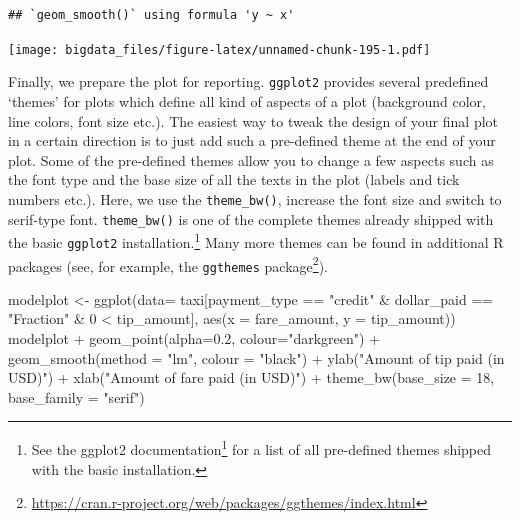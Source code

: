 \documentclass[
  12pt,
]{style/krantz}
\newenvironment{Shaded}{\begin{snugshade}}{\end{snugshade}}
\newcommand{\AttributeTok}[1]{\textcolor[rgb]{0.77,0.63,0.00}{#1}}
\newcommand{\DecValTok}[1]{\textcolor[rgb]{0.00,0.00,0.81}{#1}}
\newcommand{\FloatTok}[1]{\textcolor[rgb]{0.00,0.00,0.81}{#1}}
\newcommand{\FunctionTok}[1]{\textcolor[rgb]{0.00,0.00,0.00}{#1}}
\newcommand{\NormalTok}[1]{#1}
\newcommand{\OtherTok}[1]{\textcolor[rgb]{0.56,0.35,0.01}{#1}}
\newcommand{\SpecialCharTok}[1]{\textcolor[rgb]{0.00,0.00,0.00}{#1}}
\newcommand{\StringTok}[1]{\textcolor[rgb]{0.31,0.60,0.02}{#1}}
\renewcommand{\href}[2]{#2\footnote{\url{#1}}}
\begin{document}
\begin{verbatim}
## `geom_smooth()` using formula 'y ~ x'
\end{verbatim}

\texttt{[image: bigdata\_files/figure-latex/unnamed-chunk-195-1.pdf]}

Finally, we prepare the plot for reporting. \texttt{ggplot2} provides several predefined `themes' for plots which define all kind of aspects of a plot (background color, line colors, font size etc.). The easiest way to tweak the design of your final plot in a certain direction is to just add such a pre-defined theme at the end of your plot. Some of the pre-defined themes allow you to change a few aspects such as the font type and the base size of all the texts in the plot (labels and tick numbers etc.). Here, we use the \texttt{theme\_bw()}, increase the font size and switch to serif-type font. \texttt{theme\_bw()} is one of the complete themes already shipped with the basic \texttt{ggplot2} installation.\footnote{See \href{https://ggplot2.tidyverse.org/reference/ggtheme.html}{the ggplot2 documentation} for a list of all pre-defined themes shipped with the basic installation.} Many more themes can be found in additional R packages (see, for example, the \href{https://cran.r-project.org/web/packages/ggthemes/index.html}{\texttt{ggthemes} package}).

\begin{Shaded}
\begin{Highlighting}[]
\NormalTok{modelplot }\OtherTok{\textless{}{-}} \FunctionTok{ggplot}\NormalTok{(}\AttributeTok{data=}\NormalTok{ taxi[payment\_type }\SpecialCharTok{==} \StringTok{"credit"} \SpecialCharTok{\&}\NormalTok{ dollar\_paid }\SpecialCharTok{==} \StringTok{"Fraction"} \SpecialCharTok{\&} \DecValTok{0} \SpecialCharTok{\textless{}}\NormalTok{ tip\_amount],}
                    \FunctionTok{aes}\NormalTok{(}\AttributeTok{x =}\NormalTok{ fare\_amount, }\AttributeTok{y =}\NormalTok{ tip\_amount))}
\NormalTok{modelplot }\SpecialCharTok{+}
     \FunctionTok{geom\_point}\NormalTok{(}\AttributeTok{alpha=}\FloatTok{0.2}\NormalTok{, }\AttributeTok{colour=}\StringTok{"darkgreen"}\NormalTok{) }\SpecialCharTok{+}
     \FunctionTok{geom\_smooth}\NormalTok{(}\AttributeTok{method =} \StringTok{"lm"}\NormalTok{, }\AttributeTok{colour =} \StringTok{"black"}\NormalTok{) }\SpecialCharTok{+}
     \FunctionTok{ylab}\NormalTok{(}\StringTok{"Amount of tip paid (in USD)"}\NormalTok{) }\SpecialCharTok{+}
     \FunctionTok{xlab}\NormalTok{(}\StringTok{"Amount of fare paid (in USD)"}\NormalTok{) }\SpecialCharTok{+}
     \FunctionTok{theme\_bw}\NormalTok{(}\AttributeTok{base\_size =} \DecValTok{18}\NormalTok{, }\AttributeTok{base\_family =} \StringTok{"serif"}\NormalTok{)}
\end{Highlighting}
\end{Shaded}
\end{document}
